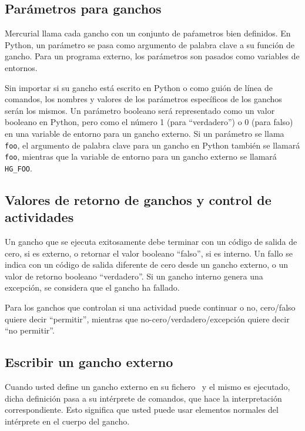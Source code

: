 \subsection{Parámetros para ganchos}
\label{sec:hook:param}

Mercurial llama cada gancho con un conjunto de paŕametros bien
definidos. En Python, un parámetro se pasa como argumento de palabra
clave a su función de gancho. Para un programa externo, los parámetros
son pasados como variables de entornos.

Sin importar si su gancho está escrito en Python o como guión de línea
de comandos, los nombres y valores de los parámetros específicos de
los ganchos serán los mismos. Un parámetro booleano será representado
como un valor booleano en Python, pero como el número 1 (para
``verdadero'') o 0 (para falso) en una variable de entorno para un
gancho externo. Si un parámetro se llama \texttt{foo}, el argumento de
palabra clave para un gancho en Python también se llamará
\texttt{foo}, mientras que la variable de entorno para un gancho
externo se llamará \texttt{HG\_FOO}.

\subsection{Valores de retorno de ganchos y control de actividades}

Un gancho que se ejecuta exitosamente debe terminar con un código de
salida de cero, si es externo, o retornar el valor booleano
``falso'', si es interno. Un fallo se indica con un código de salida
diferente de cero desde un gancho externo, o un valor de retorno
booleano ``verdadero''. Si un gancho interno genera una excepción, se
considera que el gancho ha fallado.

Para los ganchos que controlan si una actividad puede continuar o no,
cero/falso quiere decir ``permitir'', mientras que
no-cero/verdadero/excepción quiere decir ``no permitir''.

\subsection{Escribir un gancho externo}

Cuando usted define un gancho externo en su fichero \hgrc\ y el mismo
es ejecutado, dicha definición pasa a su intérprete de comandos, que
hace la interpretación correspondiente. Esto significa que usted puede
usar elementos normales del intérprete en el cuerpo del gancho.

